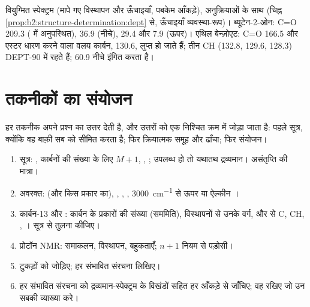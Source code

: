\begin{omfigure}
{\small वियुग्मित  स्पेक्ट्रम (मापे गए विस्थापन और ऊँचाइयाँ, पबकेम आँकड़े), 
अनुक्रियाओं के साथ (चिह्न \cref{prop:b2:structure-determination:dept} से, ऊँचाइयाँ व्यवस्था-रूप)। ब्यूटेन-2-ओन: C=O
209.3 ( में अनुपस्थित),  36.9 (नीचे),  29.4 और 7.9 (ऊपर)। एथिल बेन्ज़ोएट: C=O 166.5 और
एस्टर धारण करने वाला वलय कार्बन, 130.6, लुप्त हो जाते हैं; तीन  CH (132.8, 129.6, 128.3)
DEPT-90 में रहते हैं;  60.9 नीचे इंगित करता है।}
\end{omfigure}

\section{तकनीकों का संयोजन}

हर तकनीक अपने प्रश्न का उत्तर देती है, और उत्तरों को एक निश्चित क्रम में जोड़ा जाता है: पहले
सूत्र, क्योंकि वह बाक़ी सब को सीमित करता है; फिर क्रियात्मक समूह और ढाँचा; फिर
संयोजन।

\begin{method}[किसी अज्ञात को हल करना]\label{met:b2:structure-determination:solve}
\begin{enumerate}
  \item सूत्र: , कार्बनों की संख्या के लिए $M+1$, , ; उपलब्ध हो तो
        यथातथ द्रव्यमान। असंतृप्ति की मात्रा।
  \item अवरक्त:  (और किस प्रकार का), , , , \qty{3000}{cm^{-1}} से ऊपर  या ऐल्कीन
        ।
  \item कार्बन-13 और : कार्बन के प्रकारों की संख्या (सममिति), विस्थापनों से उनके वर्ग, और
         से C, CH, , । सूत्र से तुलना कीजिए।
  \item प्रोटॉन NMR: समाकलन, विस्थापन, बहुकताएँ; $n + 1$ नियम से पड़ोसी।
  \item टुकड़ों को जोड़िए; हर संभावित संरचना लिखिए।
  \item हर संभावित संरचना को द्रव्यमान-स्पेक्ट्रम के विखंडों सहित हर आँकड़े से जाँचिए; वह रखिए
        जो उन सबकी व्याख्या करे।
\end{enumerate}
\end{method}

